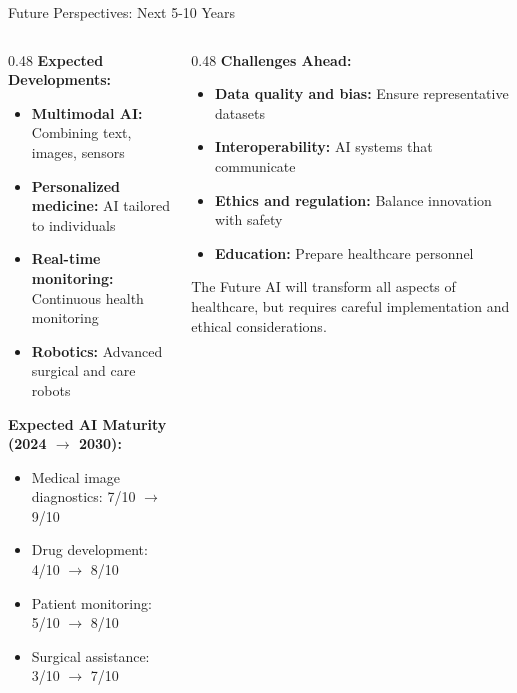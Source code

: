 \documentclass[aspectratio=169, 10pt]{beamer}
\begin{document}
\begin{frame}{Future Perspectives: Next 5-10 Years}

    \begin{columns}
        \begin{column}{0.48\textwidth}
            \textbf{Expected Developments:}
            \begin{itemize}
                \item \textbf{Multimodal AI:} Combining text, images, sensors
                \item \textbf{Personalized medicine:} AI tailored to individuals
                \item \textbf{Real-time monitoring:} Continuous health monitoring
                \item \textbf{Robotics:} Advanced surgical and care robots
            \end{itemize}

            \vspace{2mm}
            \textbf{Expected AI Maturity (2024 $\rightarrow$ 2030):}
            \begin{itemize}
                \item Medical image diagnostics: 7/10 $\rightarrow$ 9/10
                \item Drug development: 4/10 $\rightarrow$ 8/10
                \item Patient monitoring: 5/10 $\rightarrow$ 8/10
                \item Surgical assistance: 3/10 $\rightarrow$ 7/10
            \end{itemize}
        \end{column}

        \begin{column}{0.48\textwidth}
            \textbf{Challenges Ahead:}
            \begin{itemize}
                \item \textbf{Data quality and bias:} Ensure representative datasets
                \item \textbf{Interoperability:} AI systems that communicate
                \item \textbf{Ethics and regulation:} Balance innovation with safety
                \item \textbf{Education:} Prepare healthcare personnel
            \end{itemize}

            \vspace{3mm}
            \begin{alertblock}{\footnotesize The Future}
                \footnotesize
                AI will transform all aspects of healthcare, but requires careful implementation and ethical considerations.
            \end{alertblock}
        \end{column}
    \end{columns}

\end{frame}
\end{document}
